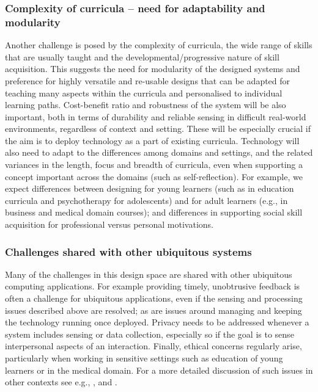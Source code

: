 \documentclass[prodmode,acmtochi]{acmsmall}
\newcommand{\GeraldineTODO}[1]{}
\newcommand{\rephrase}[1]{\textrm{\textrm{\textcolor{gray}{#1}}}}
\begin{document}
\subsubsection{Complexity of curricula -- need for adaptability and modularity}
Another challenge is posed by the complexity of curricula, the wide range of skills that are usually taught and the developmental/progressive nature of skill acquisition. This suggests the need for modularity of the designed systems and preference for highly versatile and re-usable designs that can be adapted for teaching many aspects within the curricula and personalised to individual learning paths. %
%
%
Cost-benefit ratio and robustness of the system will be also important, both in terms of durability and reliable sensing in difficult real-world environments, regardless of context and setting. These will be especially crucial if the aim is to deploy technology as a part of existing curricula. 
%
Technology will also need to adapt to the differences among domains and settings, and the related variances in the length, focus and breadth of curricula, even when supporting a concept important across the domains (such as self-reflection). For example, we expect differences between designing for young learners (such as in education curricula and psychotherapy for adolescents) and for adult learners (e.g., in business and medical domain courses); and differences in supporting social skill acquisition for professional versus personal motivations.

\GeraldineTODO{G: could reference here something from the PAL\ project   and their AIRS platform and/or the MyRoR platform as technical architectures specifically aiming to support such adaptive modularity    }

\subsubsection{Challenges shared with other ubiquitous systems} Many of the challenges in this design space are shared with other ubiquitous computing applications. For example  providing timely, unobtrusive feedback is often a challenge for ubiquitous applications, even if the sensing and processing issues described above are resolved; as are issues around managing and keeping the technology running once deployed. Privacy needs to be addressed whenever a system includes sensing or data collection,  especially so if the goal is to sense interpersonal aspects of an interaction. Finally, ethical concerns regularly arise, particularly when working in sensitive settings such as education of young learners or in the medical domain. 
For a more detailed discussion of such issues in other contexts see e.g., ,  and .
\end{document}
